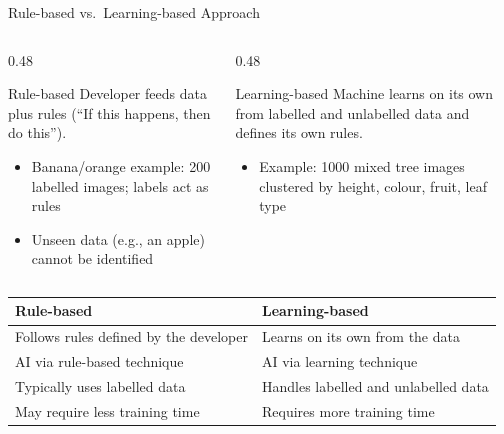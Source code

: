 \documentclass[aspectratio=169,11pt]{beamer}
\begin{document}
\begin{frame}{Rule-based vs.\ Learning-based Approach}
  \small
  \begin{columns}[T]
    \begin{column}{0.48\textwidth}
      \begin{block}{Rule-based}
        Developer feeds data plus rules (``If this happens, then do this'').
        \begin{itemize}
          \item Banana/orange example: 200 labelled images; labels act as rules
          \item Unseen data (e.g., an apple) cannot be identified
        \end{itemize}
      \end{block}
    \end{column}
    \begin{column}{0.48\textwidth}
      \begin{block}{Learning-based}
        Machine learns on its own from labelled and unlabelled data and defines its own rules.
        \begin{itemize}
          \item Example: 1000 mixed tree images clustered by height, colour, fruit, leaf type
        \end{itemize}
      \end{block}
    \end{column}
  \end{columns}
  \vspace{0.3em}
  \footnotesize
  \begin{tabular}{@{}p{5.6cm}p{5.6cm}@{}}
    \toprule
    \textbf{Rule-based} & \textbf{Learning-based} \\
    \midrule
    Follows rules defined by the developer & Learns on its own from the data \\
    AI via rule-based technique & AI via learning technique \\
    Typically uses labelled data & Handles labelled and unlabelled data \\
    May require less training time & Requires more training time \\
    \bottomrule
  \end{tabular}
\end{frame}
\end{document}

